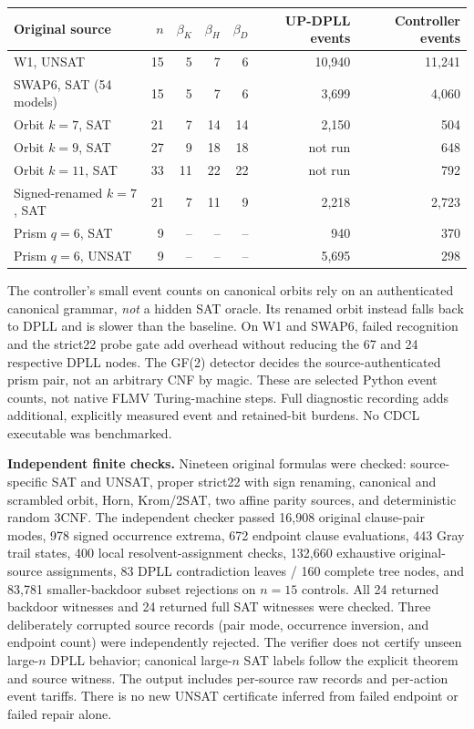 \documentclass[11pt]{article}
\begin{document}
\begin{center}\small\begin{tabular}{lrrrrrr}
\toprule
Original source & $n$ & $\beta_K$ & $\beta_H$ & $\beta_D$ & UP-DPLL events & Controller events\\\midrule
W1, UNSAT &15&5&7&6&10,940&11,241\\
SWAP6, SAT (54 models)&15&5&7&6&3,699&4,060\\
Orbit $k=7$, SAT&21&7&14&14&2,150&504\\
Orbit $k=9$, SAT&27&9&18&18&not run&648\\
Orbit $k=11$, SAT&33&11&22&22&not run&792\\
Signed-renamed $k=7$, SAT&21&7&11&9&2,218&2,723\\
Prism $q=6$, SAT&9&--&--&--&940&370\\
Prism $q=6$, UNSAT&9&--&--&--&5,695&298\\
\bottomrule\end{tabular}\end{center}
The controller's small event counts on canonical orbits rely on an authenticated canonical grammar, \emph{not} a hidden SAT oracle. Its renamed orbit instead falls back to DPLL and is slower than the baseline. On W1 and SWAP6, failed recognition and the strict22 probe gate add overhead without reducing the 67 and 24 respective DPLL nodes. The GF(2) detector decides the source-authenticated prism pair, not an arbitrary CNF by magic. These are selected Python event counts, not native FLMV Turing-machine steps. Full diagnostic recording adds additional, explicitly measured event and retained-bit burdens. No CDCL executable was benchmarked.

\noindent\textbf{Independent finite checks.} Nineteen original formulas were checked: source-specific SAT and UNSAT, proper strict22 with sign renaming, canonical and scrambled orbit, Horn, Krom/2SAT, two affine parity sources, and deterministic random 3CNF. The independent checker passed 16,908 original clause-pair modes, 978 signed occurrence extrema, 672 endpoint clause evaluations, 443 Gray trail states, 400 local resolvent-assignment checks, 132,660 exhaustive original-source assignments, 83 DPLL contradiction leaves / 160 complete tree nodes, and 83,781 smaller-backdoor subset rejections on $n=15$ controls. All 24 returned backdoor witnesses and 24 returned full SAT witnesses were checked. Three deliberately corrupted source records (pair mode, occurrence inversion, and endpoint count) were independently rejected. The verifier does not certify unseen large-$n$ DPLL behavior; canonical large-$n$ SAT labels follow the explicit theorem and source witness. The output includes per-source raw records and per-action event tariffs. There is no new UNSAT certificate inferred from failed endpoint or failed repair alone.
\end{document}
